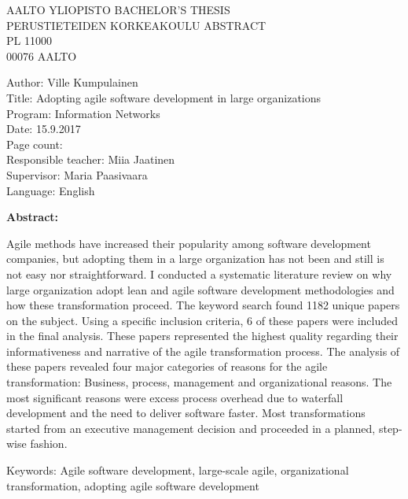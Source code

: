 
\begin{flushleft}
AALTO YLIOPISTO \hfill BACHELOR'S THESIS \\
PERUSTIETEIDEN KORKEAKOULU \hfill ABSTRACT \\
PL 11000 \\
00076 AALTO \\
\end{flushleft}

\begin{minipage}{15cm}
\begin{framed}
    Author: Ville Kumpulainen \\
    Title: Adopting agile software development in large organizations \\
    Program: Information Networks \\
    Date: 15.9.2017 \\
        Page count:~\pageref{LastPage} \\
        Responsible teacher: Miia Jaatinen \\
        Supervisor: Maria Paasivaara \\
        Language: English
\end{framed}
\end{minipage}

\bigskip

{\large\bfseries Abstract: \par} Agile methods have increased their
popularity among software development companies, but adopting them
in a large organization has not been and still is not easy nor
straightforward. I conducted a systematic literature review on why large
organization adopt lean and agile software development methodologies and
how these transformation proceed. The keyword search found 1182 unique
papers on the subject. Using a specific inclusion criteria, 6 of these
papers were included in the final analysis. These papers represented
the highest quality regarding their informativeness and narrative of
the agile transformation process. The analysis of these papers revealed
four major categories of reasons for the agile transformation: Business,
process, management and organizational reasons. The most significant
reasons were excess process overhead due to waterfall development and
the need to deliver software faster. Most transformations started from
an executive management decision and proceeded in a planned, step-wise
fashion.

\medskip

\begin{minipage}{15cm}
\begin{framed}
        Keywords: Agile software development, large-scale agile, organizational
        transformation, adopting agile software development
\end{framed}
\end{minipage}
